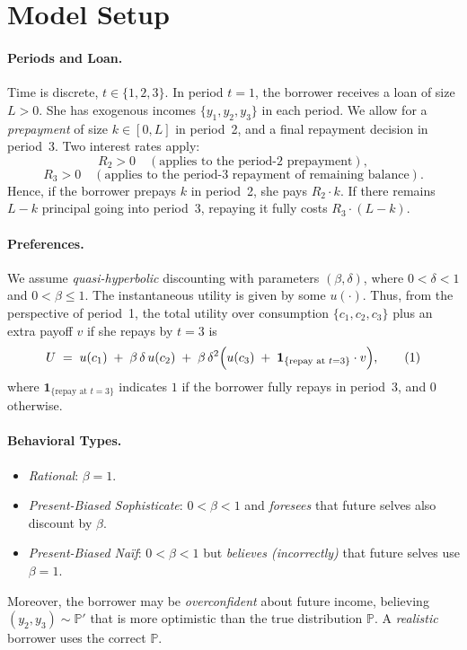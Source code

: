 \documentclass[11pt]{article}
\begin{document}
\section{Model Setup}

\paragraph{Periods and Loan.}
Time is discrete, \(t \in \{1,2,3\}\). In period \(t=1\), the borrower receives a loan of size \(L > 0\). She has exogenous incomes \(\{y_1,y_2,y_3\}\) in each period. We allow for a \emph{prepayment} of size \(k \in [0, L]\) in period~2, and a final repayment decision in period~3. Two interest rates apply:
\[
R_2 > 0 
\quad (\text{applies to the period-2 prepayment}), \]
\[R_3 > 0 
\quad (\text{applies to the period-3 repayment of remaining balance}).
\]
Hence, if the borrower prepays \(k\) in period~2, she pays \(R_2 \cdot k\). If there remains \(L - k\) principal going into period~3, repaying it fully costs \(R_3 \cdot (L - k)\).

\paragraph{Preferences.}
We assume \emph{quasi-hyperbolic} discounting with parameters \((\beta, \delta)\), where \(0 < \delta < 1\) and \(0 < \beta \le 1\). The instantaneous utility is given by some \(u(\cdot)\). Thus, from the perspective of period~1, the total utility over consumption \(\{c_1, c_2, c_3\}\) plus an extra payoff \(v\) if she repays by \(t=3\) is
\begin{align}
U 
\;=\;
u(c_1) 
\;+\;
\beta\,\delta \, u(c_2)
\;+\;
\beta\,\delta^2 
\Bigl(
   u(c_3) 
   \;+\; 
   \mathbf{1}_{\{\text{repay at }t=3\}} \cdot v
\Bigr),
\tag{1}
\end{align}
where \(\mathbf{1}_{\{\text{repay at }t=3\}}\) indicates \(1\) if the borrower fully repays in period~3, and \(0\) otherwise.

\paragraph{Behavioral Types.}
\begin{itemize}
\item \emph{Rational}: \(\beta = 1\).  
\item \emph{Present-Biased Sophisticate}: \(0 < \beta < 1\) and \emph{foresees} that future selves also discount by \(\beta\).
\item \emph{Present-Biased Na\"{i}f}: \(0 < \beta < 1\) but \emph{believes (incorrectly)} that future selves use \(\beta=1\).
\end{itemize}
Moreover, the borrower may be \emph{overconfident} about future income, believing \((y_2,y_3)\sim \mathbb{P}'\) that is more optimistic than the true distribution \(\mathbb{P}\). A \emph{realistic} borrower uses the correct \(\mathbb{P}\).
\end{document}
